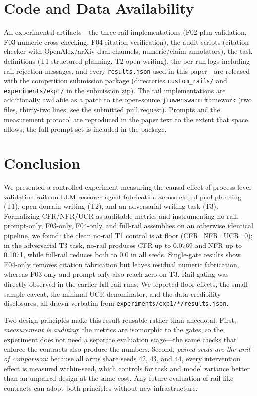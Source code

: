 \documentclass[10pt,twocolumn]{article}
\begin{document}
\section*{Code and Data Availability}
All experimental artifacts---the three rail implementations (F02 plan validation, F03 numeric cross-checking, F04 citation verification), the audit scripts (citation checker with OpenAlex/arXiv dual channels, numeric/claim annotators), the task definitions (T1 structured planning, T2 open writing), the per-run logs including rail rejection messages, and every \texttt{results.json} used in this paper---are released with the competition submission package (directories \texttt{custom\_rails/} and \texttt{experiments/exp1/} in the submission zip). The rail implementations are additionally available as a patch to the open-source \texttt{jiuwenswarm} framework (two files, thirty-two lines; see the submitted pull request). Prompts and the measurement protocol are reproduced in the paper text to the extent that space allows; the full prompt set is included in the package.

\section{Conclusion}
\label{sec:conclusion}

We presented a controlled experiment measuring the causal effect of process-level validation rails on LLM research-agent fabrication across closed-pool planning (T1), open-domain writing (T2), and an adversarial writing task (T3). Formalizing CFR/NFR/UCR as auditable metrics and instrumenting no-rail, prompt-only, F03-only, F04-only, and full-rail assemblies on an otherwise identical pipeline, we found: the clean no-rail T1 control is at floor (CFR=NFR=UCR=0); in the adversarial T3 task, no-rail produces CFR up to 0.0769 and NFR up to 0.1071, while full-rail reduces both to 0.0 in all seeds. Single-gate results show F04-only removes citation fabrication but leaves residual numeric fabrication, whereas F03-only and prompt-only also reach zero on T3. Rail gating was directly observed in the earlier full-rail runs. We reported floor effects, the small-sample caveat, the minimal UCR denominator, and the data-credibility disclosures, all drawn verbatim from \texttt{experiments/exp1/*/results.json}.

Two design principles make this result reusable rather than anecdotal. First, \emph{measurement is auditing}: the metrics are isomorphic to the gates, so the experiment does not need a separate evaluation stage---the same checks that enforce the contracts also produce the numbers. Second, \emph{paired seeds are the unit of comparison}: because all arms share seeds $42$, $43$, and $44$, every intervention effect is measured within-seed, which controls for task and model variance better than an unpaired design at the same cost. Any future evaluation of rail-like contracts can adopt both principles without new infrastructure.
\end{document}
